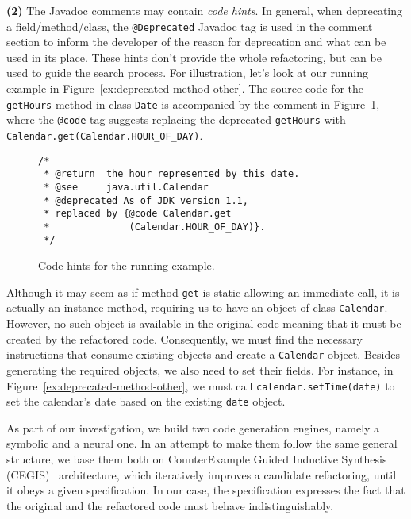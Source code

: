 \documentclass[sigconf,review,anonymous]{acmart}
\begin{document}
{\bf (2)} The Javadoc comments may contain {\em code hints}. In general, when deprecating a field/method/class, the \texttt{@Deprecated} Javadoc tag is used in the
comment section to inform the developer of the reason for deprecation and what can be used in its place. 
These hints don't provide the whole refactoring, but can be used to guide the search process.
%
For illustration, let's look at our running example in Figure~\ref{ex:deprecated-method-other}. The source code for the \texttt{getHours} method in class \texttt{Date} is accompanied by the comment in Figure~\ref{ex:code-hints}, where the \texttt{@code} tag suggests replacing the deprecated \texttt{getHours}
with \texttt{Calendar.get(Calendar.HOUR\_OF\_DAY)}.






\begin{figure}
\begin{lstlisting}[mathescape=true,showstringspaces=false]
/*
 * @return  the hour represented by this date.
 * @see     java.util.Calendar
 * @deprecated As of JDK version 1.1,
 * replaced by {@code Calendar.get
 *              (Calendar.HOUR_OF_DAY)}.
 */  
\end{lstlisting}
\caption{Code hints for the running example.}
\label{ex:code-hints}
\end{figure}




Although it may seem as if
method \texttt{get} is static allowing an immediate call,
it is actually an instance method, requiring us to have an object of
class \texttt{Calendar}. However, no such object is available in the
original code meaning that it must be created by the refactored code.
Consequently, we must find the necessary
instructions that consume existing objects and create a \texttt{Calendar} object.
Besides generating the required objects, we also need to set their
fields. For instance,
in Figure~\ref{ex:deprecated-method-other}, we must call
\texttt{calendar.setTime(date)} to set the calendar's date
based on the existing \texttt{date} object.


As part of our investigation, we build two code generation engines, namely a symbolic and a neural one.
In an attempt to make them follow the same general structure, we base them both on CounterExample Guided Inductive Synthesis (CEGIS)~\cite{DBLP:conf/pldi/Solar-LezamaJB08} architecture, which 
iteratively improves a candidate refactoring, until it obeys a given specification. In our case, the specification expresses the fact that the original and
the refactored code must behave indistinguishably.
\end{document}
